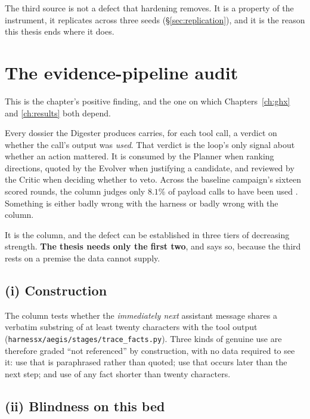 The third source is not a defect that hardening removes. It is a property
of the instrument, it replicates across three seeds
(\S\ref{sec:replication}), and it is the reason this thesis ends where it
does.

\section{The evidence-pipeline audit}
\label{sec:evidence-audit}

This is the chapter's positive finding, and the one on which
Chapters~\ref{ch:ghx} and \ref{ch:results} both depend.

Every dossier the Digester produces carries, for each tool call, a verdict
on whether the call's output was \emph{used}. That verdict is the loop's
only signal about whether an action mattered. It is consumed by the
Planner when ranking directions, quoted by the Evolver when justifying a
candidate, and reviewed by the Critic when deciding whether to veto. Across
the baseline campaign's sixteen scored rounds, the column judges only
$8.1\%$ of payload calls to have been used . Something is either badly wrong with the harness or badly wrong with
the column.

It is the column, and the defect can be established in three tiers of
decreasing strength. \textbf{The thesis needs only the first two}, and
says so, because the third rests on a premise the data cannot supply.

\subsection*{(i) Construction}

The column tests whether the \emph{immediately next} assistant message
shares a verbatim substring of at least twenty characters with the tool
output (\texttt{harnessx/\allowbreak aegis/\allowbreak stages/\allowbreak trace\_facts.py}). Three kinds of
genuine use are therefore graded ``not referenced'' by construction, with
no data required to see it: use that is paraphrased rather than quoted; use
that occurs later than the next step; and use of any fact shorter than
twenty characters.

\subsection*{(ii) Blindness on this bed}

